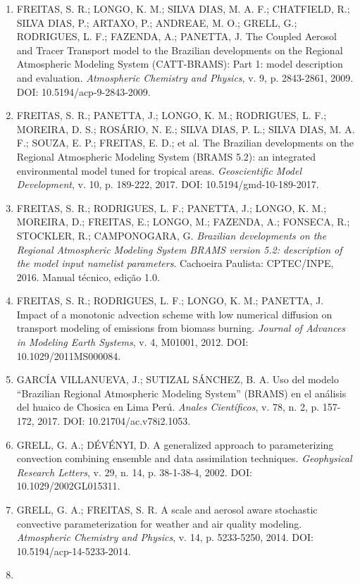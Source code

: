 \documentclass[12pt,a4paper,oneside]{book}
\begin{document}
\begin{enumerate}
\item
  FREITAS, S. R.; LONGO, K. M.; SILVA DIAS, M. A. F.; CHATFIELD, R.; SILVA DIAS, P.; ARTAXO, P.; ANDREAE, M. O.; GRELL, G.; RODRIGUES, L. F.; FAZENDA, A.; PANETTA, J. The Coupled Aerosol and Tracer Transport model to the Brazilian developments on the Regional Atmospheric Modeling System (CATT-BRAMS): Part 1: model description and evaluation. \emph{Atmospheric Chemistry and Physics}, v. 9, p. 2843-2861, 2009. DOI: 10.5194/acp-9-2843-2009.
\item
  FREITAS, S. R.; PANETTA, J.; LONGO, K. M.; RODRIGUES, L. F.; MOREIRA, D. S.; ROSÁRIO, N. E.; SILVA DIAS, P. L.; SILVA DIAS, M. A. F.; SOUZA, E. P.; FREITAS, E. D.; et al. The Brazilian developments on the Regional Atmospheric Modeling System (BRAMS 5.2): an integrated environmental model tuned for tropical areas. \emph{Geoscientific Model Development}, v. 10, p. 189-222, 2017. DOI: 10.5194/gmd-10-189-2017.
\item
  FREITAS, S. R.; RODRIGUES, L. F.; PANETTA, J.; LONGO, K. M.; MOREIRA, D.; FREITAS, E.; LONGO, M.; FAZENDA, A.; FONSECA, R.; STOCKLER, R.; CAMPONOGARA, G. \emph{Brazilian developments on the Regional Atmospheric Modeling System BRAMS version 5.2: description of the model input namelist parameters}. Cachoeira Paulista: CPTEC/INPE, 2016. Manual técnico, edição 1.0.
\item
  FREITAS, S. R.; RODRIGUES, L. F.; LONGO, K. M.; PANETTA, J. Impact of a monotonic advection scheme with low numerical diffusion on transport modeling of emissions from biomass burning. \emph{Journal of Advances in Modeling Earth Systems}, v. 4, M01001, 2012. DOI: 10.1029/2011MS000084.
\item
  GARCÍA VILLANUEVA, J.; SUTIZAL SÁNCHEZ, B. A. Uso del modelo ``Brazilian Regional Atmospheric Modeling System'' (BRAMS) en el análisis del huaico de Chosica en Lima Perú. \emph{Anales Científicos}, v. 78, n. 2, p. 157-172, 2017. DOI: 10.21704/ac.v78i2.1053.
\item
  GRELL, G. A.; DÉVÉNYI, D. A generalized approach to parameterizing convection combining ensemble and data assimilation techniques. \emph{Geophysical Research Letters}, v. 29, n. 14, p. 38-1-38-4, 2002. DOI: 10.1029/2002GL015311.
\item
  GRELL, G. A.; FREITAS, S. R. A scale and aerosol aware stochastic convective parameterization for weather and air quality modeling. \emph{Atmospheric Chemistry and Physics}, v. 14, p. 5233-5250, 2014. DOI: 10.5194/acp-14-5233-2014.
\item

\end{enumerate}
\end{document}
